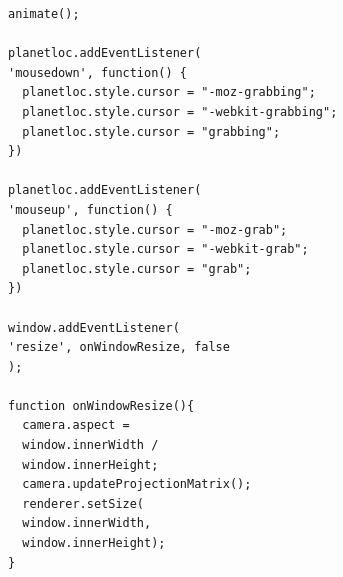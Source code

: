 \documentclass[journal]{vgtc}                %
\begin{document}
\begin{lstlisting}[frame=single]
animate();

planetloc.addEventListener(
'mousedown', function() { 
  planetloc.style.cursor = "-moz-grabbing";
  planetloc.style.cursor = "-webkit-grabbing";
  planetloc.style.cursor = "grabbing";
})

planetloc.addEventListener(
'mouseup', function() { 
  planetloc.style.cursor = "-moz-grab";
  planetloc.style.cursor = "-webkit-grab";
  planetloc.style.cursor = "grab";
})

window.addEventListener( 
'resize', onWindowResize, false 
);

function onWindowResize(){
  camera.aspect = 		 	
  window.innerWidth / 
  window.innerHeight;
  camera.updateProjectionMatrix();
  renderer.setSize(
  window.innerWidth, 
  window.innerHeight);
}
\end{lstlisting}
\end{document}
